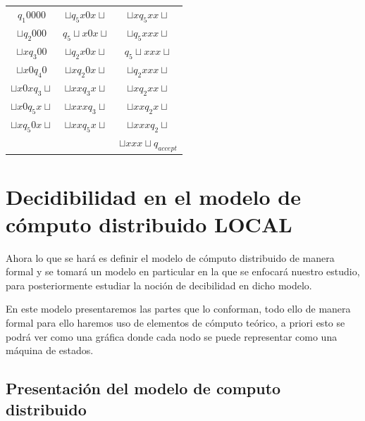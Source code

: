\documentclass[10pt]{report}
\begin{document}
    \begin{center}
        \begin{tabular}{c c c}
            $q_{1}0000$ &     $\sqcup q_{5}x0x\sqcup$ & $\sqcup xq_{5}xx\sqcup$ \\
            $\sqcup q_{2}000$ & $q_{5}\sqcup x0x\sqcup$ & $\sqcup q_{5}xxx\sqcup$\\
            $\sqcup xq_{3}00$ & $\sqcup q_{2}x0x\sqcup$ & $q_{5}\sqcup xxx\sqcup$\\
            $\sqcup x0q_{4}0$  & $\sqcup xq_{2}0x\sqcup$ &   $\sqcup q_{2}xxx\sqcup$\\
            $\sqcup x0xq_{3}\sqcup$ & $\sqcup xxq_{3}x\sqcup$ & $\sqcup xq_{2}xx\sqcup$ \\
            $\sqcup x0q_{5}x\sqcup$ & $\sqcup xxxq_{3}\sqcup$ & $\sqcup xxq_{2}x\sqcup$ \\
            $\sqcup xq_{5}0x\sqcup$ & $\sqcup xxq_{5}x\sqcup$ & $\sqcup xxxq_{2}\sqcup$ \\
                            &                                 & $\sqcup xxx\sqcup q_{accept}$ \\
        \end{tabular}
    \end{center}


    \section{Decidibilidad en el modelo de cómputo distribuido  \textbf{LOCAL}}\label{sec:decidibilidad-en-el-modelo-de-computo-distribuidotextbf}
    Ahora lo que se hará es definir el modelo de cómputo distribuido de manera formal
    y se tomará un modelo en particular en la que se enfocará nuestro estudio, para posteriormente
    estudiar la noción de decibilidad en dicho modelo.\newline

    En este modelo presentaremos las partes que lo conforman, todo ello de manera formal para ello
    haremos uso de elementos de cómputo teórico, a priori esto se podrá ver como una gráfica donde cada
    nodo se puede representar como una máquina de estados.



    \subsection{Presentación del modelo de computo distribuido}\label{subsec:presentación-del-modelo-de-computo-distribuido}
\end{document}
